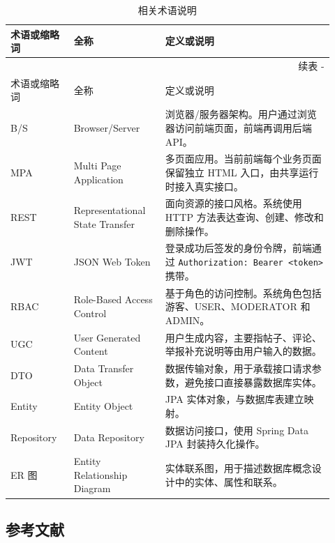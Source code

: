 \documentclass[UTF8,zihao=-4,a4paper]{ctexart}
\renewcommand{\thetable}{\thesection-\arabic{table}}
\begin{document}
\begin{longtable}{L{0.18\linewidth}L{0.26\linewidth}L{0.48\linewidth}}
\caption{相关术语说明}\\
\toprule
术语或缩略词 & 全称 & 定义或说明 \\
\midrule
\endfirsthead
\multicolumn{3}{r}{续表 \thetable}\\
\toprule
术语或缩略词 & 全称 & 定义或说明 \\
\midrule
\endhead
\bottomrule
\endfoot
B/S & Browser/Server & 浏览器/服务器架构。用户通过浏览器访问前端页面，前端再调用后端 API。\\
MPA & Multi Page Application & 多页面应用。当前前端每个业务页面保留独立 HTML 入口，由共享运行时接入真实接口。\\
REST & Representational State Transfer & 面向资源的接口风格。系统使用 HTTP 方法表达查询、创建、修改和删除操作。\\
JWT & JSON Web Token & 登录成功后签发的身份令牌，前端通过 \texttt{Authorization: Bearer <token>} 携带。\\
RBAC & Role-Based Access Control & 基于角色的访问控制。系统角色包括游客、USER、MODERATOR 和 ADMIN。\\
UGC & User Generated Content & 用户生成内容，主要指帖子、评论、举报补充说明等由用户输入的数据。\\
DTO & Data Transfer Object & 数据传输对象，用于承载接口请求参数，避免接口直接暴露数据库实体。\\
Entity & Entity Object & JPA 实体对象，与数据库表建立映射。\\
Repository & Data Repository & 数据访问接口，使用 Spring Data JPA 封装持久化操作。\\
ER 图 & Entity Relationship Diagram & 实体联系图，用于描述数据库概念设计中的实体、属性和联系。\\
\end{longtable}

\subsection{参考文献}
\end{document}
